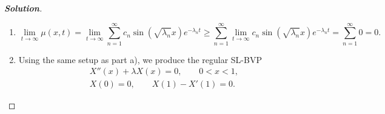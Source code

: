 \documentclass[letterpaper,11pt]{article} %
\theoremstyle{plain}
\begin{document}
\begin{proof}[\textbf{Solution}]
\begin{enumerate}[label=\alph*.)]
        The formal solution to the given heat problem can therefore be expressed as
        \begin{equation*}
        \mu(x, t) = \sum_{n=1}^\infty c_n \sin(\sqrt{\lambda_n}x) e^{-\lambda_n t}.
        \end{equation*}
        Since $\mu(x, 0) = f(x) = 75$,
        \begin{align*}
            \mu(x, 0) = \sum_{n=1}^\infty c_n \sin(\sqrt{\lambda_n}x) &= f(x) = 75
            \shortintertext{so}
            c_n = \frac{\displaystyle \int_0^1 f(x) X_n(x)\,\mathrm{d}x}{\displaystyle\int_0^1 X^2_n(x)\,\mathrm{d}x} &= \frac{\displaystyle 75\int_0^1  \sin(\sqrt{\lambda_n}x)\,\mathrm{d}x}{\displaystyle\int_0^1 \sin^2(\sqrt{\lambda_n}x)\,\mathrm{d}x} = \frac{\displaystyle \frac{75}{\sqrt{\lambda_n}}\left.\cos(\sqrt{\lambda_n}x)\right|_0^1}{\displaystyle \int_0^1 \left(\frac{1}{2} - \frac{1}{2} \cos(2\sqrt{\lambda_n}x)\right)\,\mathrm{d}x} \\
            &= \frac{\displaystyle \frac{75}{\sqrt{\lambda_n}}\left(\cos(\sqrt{\lambda_n} )- 1\right)}{\displaystyle \frac{1}{2} - \frac{1}{4\sqrt{\lambda_n}}\left.\sin(2\sqrt{\lambda_n}x)\right|_0^1 } = \frac{\displaystyle \frac{75}{\sqrt{\lambda_n}}\left(\cos(\sqrt{\lambda_n} )- 1\right)}{\displaystyle \frac{1}{2} - \frac{1}{4\sqrt{\lambda_n}}\sin(2\sqrt{\lambda_n})}
        \end{align*}
        The complete solution is therefore
        \begin{equation*}
         \boxed{\mu(x, t) = \sum_{n=1}^\infty \left(\frac{\displaystyle 75\left(\cos(\sqrt{\lambda_n} )- 1\right)}{\displaystyle \frac{\sqrt{\lambda_n}}{2} - \frac{1}{4}\sin(2\sqrt{\lambda_n})} \right)\sin(\sqrt{\lambda_n}x) e^{-\lambda_n t}}.
        \end{equation*}
        where the eigenvalues $\lambda_n$ satisfy the transcendental equation $\tan(\sqrt{\lambda_n}) = -\sqrt{\lambda_n}$.
        
        \item \begin{equation*}
        \lim\limits_{t \to \infty} \mu(x, t) =  \lim\limits_{t \to \infty}\sum_{n=1}^\infty c_n \sin(\sqrt{\lambda_n}x) e^{-\lambda_n t} \geq \sum_{n=1}^\infty \lim\limits_{t \to \infty} c_n \sin(\sqrt{\lambda_n}x) e^{-\lambda_n t} = \sum_{n=1}^\infty 0 = 0.
        \end{equation*}
        
        \item Using the same setup as part a), we produce the regular SL-BVP
        \begin{gather*}
            X''(x) + \lambda X(x) = 0, \qquad 0 < x < 1, \\
            X(0) = 0, \qquad X(1) - X'(1) = 0.
        \end{gather*}
        
    \end{enumerate}
\end{proof}
\end{document}
